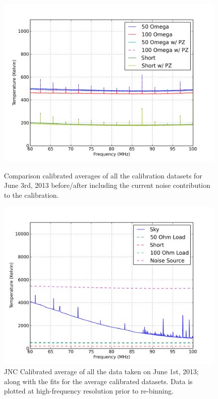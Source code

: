 \begin{figure}[htb]
\centering
\begin{minipage}[b]{0.48\textwidth}
\centering
\includegraphics[width=0.95\linewidth]{Data_analysis/figures/June_03_comp_test.png}
\caption{Comparison calibrated averages of all the calibration datasets for June 3rd, 2013 before/after including the current noise contribution to the calibration. }
\label{Fig:avg_cal_comp}
\end{minipage}%
\begin{minipage}[b]{0.02\textwidth}
\hspace{1cm}
\end{minipage}%
\begin{minipage}[b]{0.48\textwidth}
\centering
\includegraphics[width=0.95\linewidth]{Data_analysis/figures/June_01_mean_JNCcal_spectrum_full_ref.png}
\caption{JNC Calibrated average of all the data taken on June 1st, 2013; along with the fits for the average calibrated datasets. Data is plotted at high-frequency resolution prior to re-binning. }
\label{Fig:avg_JNCcal_data}
\end{minipage}
\end{figure}



